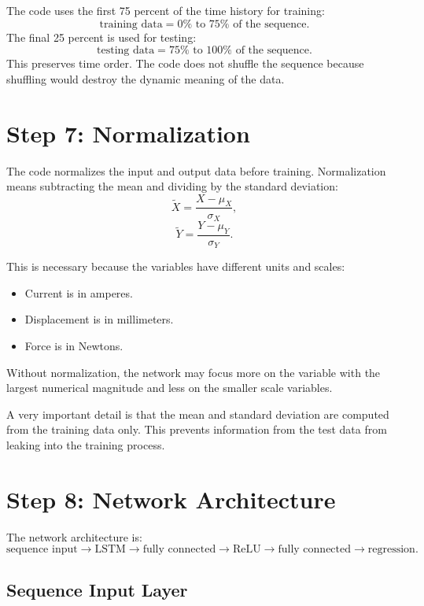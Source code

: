 \documentclass[11pt]{article}
\begin{document}
The code uses the first 75 percent of the time history for training:
\[
    \text{training data} = 0\% \text{ to } 75\% \text{ of the sequence}.
\]
The final 25 percent is used for testing:
\[
    \text{testing data} = 75\% \text{ to } 100\% \text{ of the sequence}.
\]
This preserves time order. The code does not shuffle the sequence because shuffling would destroy the dynamic meaning of the data.

\section{Step 7: Normalization}

The code normalizes the input and output data before training. Normalization means subtracting the mean and dividing by the standard deviation:
\begin{equation}
    \tilde{X} = \frac{X - \mu_X}{\sigma_X},
\end{equation}
\begin{equation}
    \tilde{Y} = \frac{Y - \mu_Y}{\sigma_Y}.
\end{equation}

This is necessary because the variables have different units and scales:
\begin{itemize}[leftmargin=1.2cm]
    \item Current is in amperes.
    \item Displacement is in millimeters.
    \item Force is in Newtons.
\end{itemize}

Without normalization, the network may focus more on the variable with the largest numerical magnitude and less on the smaller scale variables.

A very important detail is that the mean and standard deviation are computed from the training data only. This prevents information from the test data from leaking into the training process.

\section{Step 8: Network Architecture}

The network architecture is:
\[
\text{sequence input} \rightarrow \text{LSTM} \rightarrow \text{fully connected} \rightarrow \text{ReLU} \rightarrow \text{fully connected} \rightarrow \text{regression}.
\]

\subsection{Sequence Input Layer}
\end{document}
